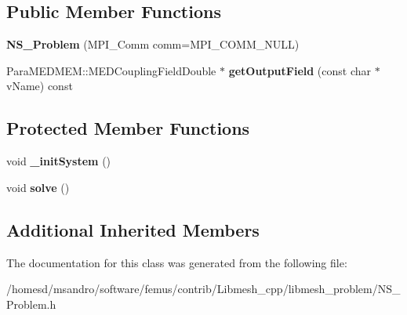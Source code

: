 \subsection*{Public Member Functions}
\begin{DoxyCompactItemize}
\item 
\hypertarget{class_n_s___problem_a64926f3eaa48618d5e96b76e9c3e8c01}{{\bfseries N\-S\-\_\-\-Problem} (M\-P\-I\-\_\-\-Comm comm=M\-P\-I\-\_\-\-C\-O\-M\-M\-\_\-\-N\-U\-L\-L)}\label{class_n_s___problem_a64926f3eaa48618d5e96b76e9c3e8c01}

\item 
\hypertarget{class_n_s___problem_a93c104e0d749884e447315ca3ac23a25}{Para\-M\-E\-D\-M\-E\-M\-::\-M\-E\-D\-Coupling\-Field\-Double $\ast$ {\bfseries get\-Output\-Field} (const char $\ast$v\-Name) const }\label{class_n_s___problem_a93c104e0d749884e447315ca3ac23a25}

\end{DoxyCompactItemize}
\subsection*{Protected Member Functions}
\begin{DoxyCompactItemize}
\item 
\hypertarget{class_n_s___problem_a6ebc7696f40b10db61d600ff76650c79}{void {\bfseries \-\_\-init\-System} ()}\label{class_n_s___problem_a6ebc7696f40b10db61d600ff76650c79}

\item 
\hypertarget{class_n_s___problem_a2a89eee5839c48d2deffee37b9aafd4a}{void {\bfseries solve} ()}\label{class_n_s___problem_a2a89eee5839c48d2deffee37b9aafd4a}

\end{DoxyCompactItemize}
\subsection*{Additional Inherited Members}


The documentation for this class was generated from the following file\-:\begin{DoxyCompactItemize}
\item 
/homesd/msandro/software/femus/contrib/\-Libmesh\-\_\-cpp/libmesh\-\_\-problem/N\-S\-\_\-\-Problem.\-h\end{DoxyCompactItemize}
